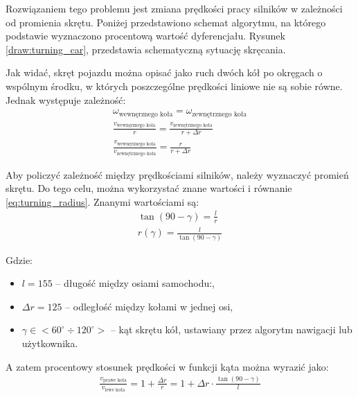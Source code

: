         Rozwiązaniem tego problemu jest zmiana prędkości pracy silników w zależności od promienia skrętu.
        Poniżej przedstawiono schemat algorytmu, na którego podstawie wyznaczono procentową wartość dyferencjału.
        Rysunek \ref{draw:turning_car}, przedstawia schematyczną sytuację skręcania.
        

        Jak widać, skręt pojazdu można opisać jako ruch dwóch kół po okręgach o wspólnym środku, w których poszczególne prędkości liniowe nie są sobie równe.
        Jednak występuje zależność:
        \begin{gather}
            \omega_{\text{wewnęrznego koła}} = \omega_{\text{zewnętrznego koła}}\\
            \frac{v_{\text{wewnęrznego koła}}}{r} = \frac{v_{\text{zewnętrznego koła}}}{r + \Delta r}\\
            \frac{v_\text{wewnęrznego koła}}{v_{\text{zewnętrznego koła}}} = \frac{r}{r + \Delta r}
        \end{gather}

        Aby policzyć zależność między prędkościami silników, należy wyznaczyć promień skrętu.
        Do tego celu, można wykorzystać znane wartości i równanie \ref{eq:turning_radius}.
        Znanymi wartościami są:
        \begin{gather}
            \tan \left(90 - \gamma\right) = \frac{l}{r}\\
            r(\gamma) = \frac{l}{\tan(90-\gamma)}
            \label{eq:turning_radius}
        \end{gather}

        Gdzie:
        \begin{itemize}
            \item $l = 155$ -- długość między osiami samochodu:,
            \item $\Delta r = 125$ -- odległość między kołami w jednej osi,
            \item $\gamma \in <60^\circ \div 120^\circ>$ -- kąt skrętu kół, ustawiany przez algorytm nawigacji lub użytkownika.
        \end{itemize}

        A zatem procentowy stosunek prędkości w funkcji kąta można wyrazić jako:
        \begin{gather}
            \frac{v_{\text{prawe koła}}}{v_{\text{lewe koła}}} = 1 + \frac{\Delta r}{r} = 1 + \Delta r \cdot \frac{\tan(90 - \gamma)}{l}
        \end{gather}


